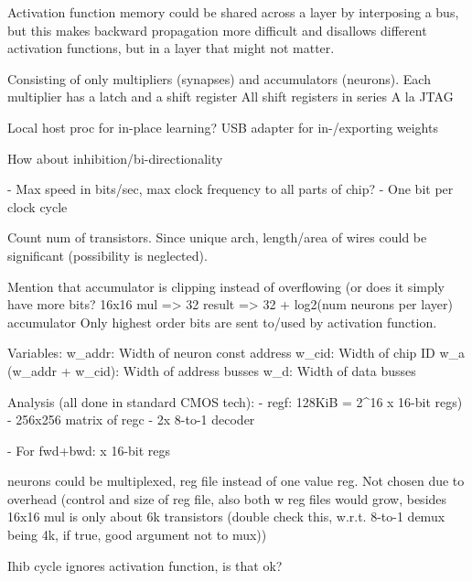 \documentclass[twocolumn]{article}
\begin{document}
Activation function memory could be shared across a layer by interposing a bus, but this makes backward propagation more difficult and disallows different activation functions, but in a layer that might not matter.


Consisting of only multipliers (synapses) and accumulators (neurons).
Each multiplier has a latch and a shift register
All shift registers in series
A la JTAG


Local host proc for in-place learning?
USB adapter for in-/exporting weights


How about inhibition/bi-directionality


- Max speed in bits/sec, max clock frequency to all parts of chip?
   - One bit per clock cycle



Count num of transistors.
Since unique arch, length/area of wires could be significant (possibility is neglected).

Mention that accumulator is clipping instead of overflowing (or does it simply have more bits?
16x16 mul => 32 result => 32 + log2(num neurons per layer) accumulator
Only highest order bits are sent to/used by activation function.




Variables:
w_addr: Width of neuron const address
w_cid: Width of chip ID
w_a (w_addr + w_cid): Width of address busses
w_d: Width of data busses








Analysis (all done in standard CMOS tech):
  - regf: 128KiB = 2^16 x 16-bit regs)
    - 256x256 matrix of regc
    - 2x 8-to-1 decoder

    - For fwd+bwd: x 16-bit regs








neurons could be multiplexed, reg file instead of one value reg. Not chosen due to overhead (control and size of reg file, also both w reg files would grow, besides 16x16 mul is only about 6k transistors (double check this, w.r.t. 8-to-1 demux being 4k, if true, good argument not to mux))


Ihib cycle ignores activation function, is that ok?
\end{document}
